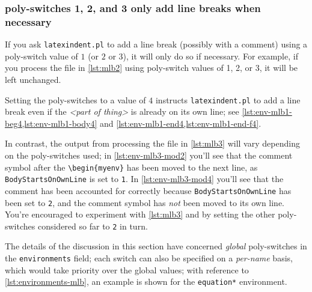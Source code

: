 \subsubsection{poly-switches 1, 2, and 3 only add line breaks when necessary}
	If you ask \texttt{latexindent.pl} to add a line break (possibly with a comment)
	using a poly-switch value of $1$ (or $2$
	or $3$), it will only do so if necessary. For example, if you
	process the file in \vref{lst:mlb2} using poly-switch values of 1, 2, or 3,
	it will be left unchanged.

	\begin{minipage}{.45\linewidth}
	\end{minipage}
	\hfill
	\begin{minipage}{.45\linewidth}
	\end{minipage}

	Setting the poly-switches to a value of $4$ instructs
	\texttt{latexindent.pl} to add a line break even if the \emph{<part of thing>}
	is already on its own line; see \cref{lst:env-mlb1-beg4,lst:env-mlb1-body4} and
	\cref{lst:env-mlb1-end4,lst:env-mlb1-end-f4}.

	In contrast, the output from processing the file in \cref{lst:mlb3} will
	vary depending on the poly-switches used; in \cref{lst:env-mlb3-mod2} you'll see that
	the comment symbol after the \lstinline!\begin{myenv}! has been moved to the next line,
	as \texttt{BodyStartsOnOwnLine} is set to \texttt{1}. In
	\cref{lst:env-mlb3-mod4} you'll see that the comment has been accounted for correctly
	because \texttt{BodyStartsOnOwnLine} has been set to \texttt{2}, and
	the comment symbol has \emph{not} been moved to its own line. You're
	encouraged to experiment with \cref{lst:mlb3} and by setting the other
	poly-switches considered so far to \texttt{2} in turn.

	\begin{cmhtcbraster}[raster column skip=.1\linewidth]
	\end{cmhtcbraster}

	The details of the discussion in this section have concerned \emph{global}
	poly-switches in the \texttt{environments} field; each switch can also be
	specified on a \emph{per-name} basis, which would take priority over the
	global values; with reference to \vref{lst:environments-mlb}, an example is shown for
	the \texttt{equation*} environment.

